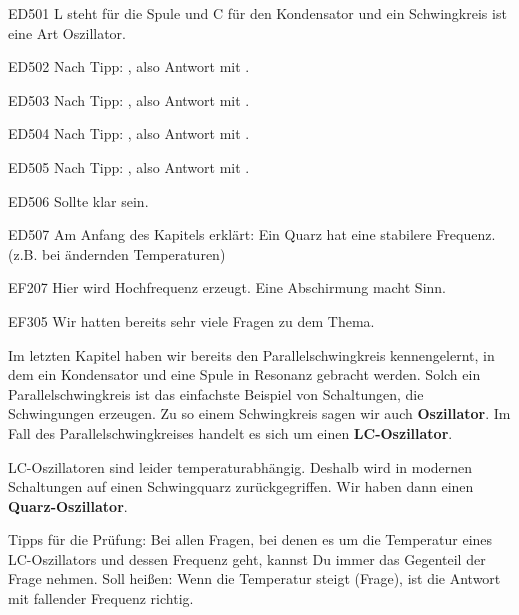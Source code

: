 \begin{sol}{ED501}
L steht für die Spule und C für den Kondensator und ein Schwingkreis ist eine Art Oszillator.
\end{sol}

\begin{sol}{ED502}
Nach Tipp: , also Antwort mit .
\end{sol}


\begin{sol}{ED503}
Nach Tipp: , also Antwort mit .
\end{sol}

\begin{sol}{ED504}
Nach Tipp: , also Antwort mit .
\end{sol}


\begin{sol}{ED505}
Nach Tipp: , also Antwort mit .
\end{sol}


\begin{sol}{ED506}
    Sollte klar sein.
\end{sol}


\begin{sol}{ED507}
    Am Anfang des Kapitels erklärt: Ein Quarz hat eine stabilere Frequenz. (z.B. bei ändernden Temperaturen)
\end{sol}

\begin{sol}{EF207}
    Hier wird Hochfrequenz erzeugt. Eine Abschirmung macht Sinn.
\end{sol}

\begin{sol}{EF305}
    Wir hatten bereits sehr viele Fragen zu dem Thema.
\end{sol}


\begin{ohmchapter}
Im letzten Kapitel haben wir bereits den Parallelschwingkreis kennengelernt, in dem ein Kondensator und eine Spule in Resonanz gebracht werden. Solch ein Parallelschwingkreis ist das einfachste Beispiel von Schaltungen, die Schwingungen erzeugen. Zu so einem Schwingkreis sagen wir auch \textbf{Oszillator}. Im Fall des Parallelschwingkreises handelt es sich um einen \textbf{LC-Oszillator}.

LC-Oszillatoren sind leider temperaturabhängig. Deshalb wird in modernen Schaltungen auf einen Schwingquarz zurückgegriffen. Wir haben dann einen \textbf{Quarz-Oszillator}.

Tipps für die Prüfung: Bei allen Fragen, bei denen es um die Temperatur eines LC-Oszillators und dessen Frequenz geht, kannst Du immer das Gegenteil der Frage nehmen. Soll heißen: Wenn die Temperatur steigt (Frage), ist die Antwort mit fallender Frequenz richtig.

\end{ohmchapter} 

